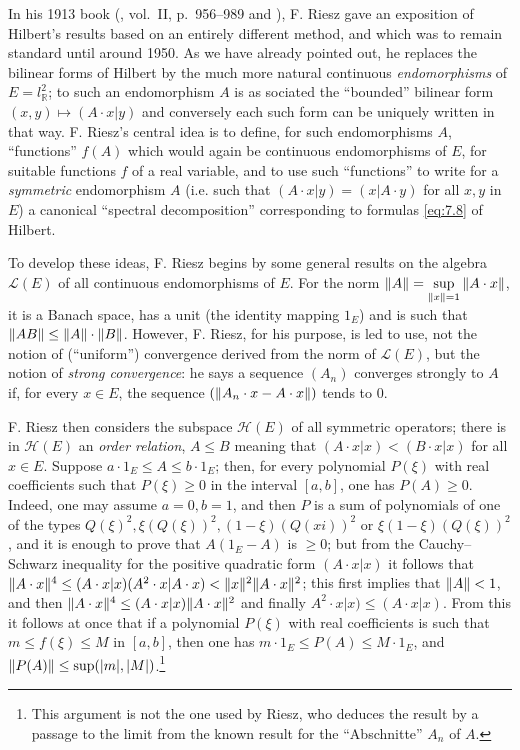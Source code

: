 \documentclass[12pt,a4paper,leqno,twoside]{extbook}
\DeclarePairedDelimiter{\norm}{\lVert}{\rVert}
\newcommand{\R}{\mathbb{R}}
\begin{document}
In his 1913 book (\cite{183}, vol.~II, p.~956--989 and \cite{184}), F. Riesz gave an exposition of Hilbert's results based on an entirely different method, and which was to remain standard until around 1950. As we have already pointed out, he replaces the bilinear forms of Hilbert by the much more natural continuous \emph{endomorphisms} of \(E = l^2_{\R}\); to such an endomorphism \(A\) is as sociated the ``bounded'' bilinear form \((x,y) \mapsto (A \cdot x|y)\) and conversely each such form can be uniquely written in that way. F. Riesz's central idea is to define, for such endomorphisms \(A\), ``functions'' \(f(A)\) which would again be continuous endomorphisms of \(E\), for suitable functions \(f\) of a real variable, and to use such ``functions'' to write for a \emph{symmetric} endomorphism \(A\) (i.e. such that \((A \cdot x|y) = (x|A \cdot y)\) for all \(x,y\) in \(E\)) a canonical ``spectral decomposition'' corresponding to formulas \eqref{eq:7.8} of Hilbert.

To develop these ideas, F. Riesz begins by some general results on the algebra \(\mathcal{L}(E)\) of all continuous endomorphisms of \(E\). For the norm \(\norm{A} = \sup\limits_{\norm{x}=1}{\norm{A \cdot x}}\), it is a Banach space, has a unit (the identity mapping \(1_E\)) and is such that \(\norm{AB} \leq \norm{A} \cdot \norm{B}\). However, F. Riesz, for his purpose, is led to use, not the notion of (``uniform'') convergence derived from the norm of \(\mathcal{L}(E)\), but the notion of \emph{strong convergence}: he says a sequence \((A_n)\) converges strongly to \(A\) if, for every \(x \in E\), the sequence \((\norm{A_n \cdot x - A \cdot x})\) tends to 0.

F. Riesz then considers the subspace \(\mathcal{H}(E)\) of all symmetric operators; there is in \(\mathcal{H}(E)\) an \emph{order relation}, \(A \leq B\) meaning that \((A \cdot x|x) < (B \cdot x|x)\) for all \(x \in E\). Suppose \(a \cdot 1_E \leq A \leq b \cdot 1_E\); then, for every polynomial \(P(\xi)\) with real coefficients such that \(P(\xi) \geq 0\) in the interval \([a,b]\), one has \(P(A) \geq 0\). Indeed, one may assume \(a = 0, b = 1\), and then \(P\) is a sum of polynomials of one of the types \(Q(\xi)^2, \xi(Q(\xi))^2, (1-\xi)(Q(xi))^2\) or \(\xi(1-\xi)(Q(\xi))^2\), and it is enough to prove that \(A(1_E - A)\) is \(\geq 0\); but from the Cauchy--Schwarz inequality for the positive quadratic form \((A \cdot x|x)\) it follows that \(\norm{A \cdot x}^4 \leq (A \cdot x|x)(A^2 \cdot x|A \cdot x) < \norm{x}^2 \norm{A \cdot x}^2\); this first implies that \(\norm{A} < 1\), and then \(\norm{A \cdot x}^4 \leq (A \cdot x|x)\norm{A \cdot x}^2\) and finally \(A^2 \cdot x|x) \leq (A \cdot x|x)\). From this it follows at once that if a polynomial \(P(\xi)\) with real coefficients is such that \(m \leq f(\xi) \leq M\) in \([a,b]\), then one has \(m \cdot 1_E \leq P(A) \leq M \cdot 1_E\), and \(\norm{P(A)} \leq \sup(|m|, |M|)\).\footnote{This argument is not the one used by Riesz, who deduces the result by a passage to the limit from the known result for the ``Abschnitte'' \(A_n\) of \(A\).}
\end{document}
